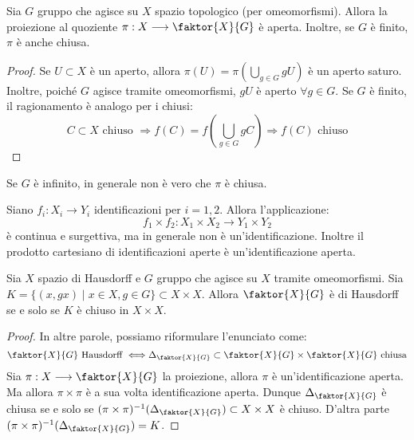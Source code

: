 \begin{prop}
Sia $G$ gruppo che agisce su $X$ spazio topologico (per omeomorfismi). Allora la proiezione al quoziente $\pi:X \longrightarrow \faktor {X}{G}$ è aperta. Inoltre, se $G$ è finito, $\pi$ è anche chiusa.
\end{prop}
\begin{proof}
Se $U \subset X$ è un aperto, allora $\pi (U)=\pi \left(\bigcup _{g \in G} gU\right)$ è un aperto saturo. Inoltre, poiché $G$ agisce tramite omeomorfismi, $gU$ è aperto $\forall g \in G$. Se $G$ è finito, il ragionamento è analogo per i chiusi:
$$C \subset X \text{ chiuso } \Longrightarrow f(C)=f\left(\bigcup _{g \in G} gC\right) \Longrightarrow f(C) \text{ chiuso}$$
\end{proof}

\begin{oss}
Se $G$ è infinito, in generale non è vero che $\pi$ è chiusa.
\end{oss}

\begin{oss}
Siano $f_i:X_i \longrightarrow Y_i$ identificazioni per $i=1,2$. Allora l'applicazione:
$$f_1 \times f_2:X_1 \times X_2 \longrightarrow Y_1 \times Y_2$$
è continua e surgettiva, ma in generale non è un'identificazione. Inoltre il prodotto cartesiano di identificazioni aperte è un'identificazione aperta.
\end{oss}

\begin{prop}
Sia $X$ spazio di Hausdorff e $G$ gruppo che agisce su $X$ tramite omeomorfismi. Sia $K=\{(x,gx) \mid x \in X, g \in G \} \subset X \times X$. Allora $\faktor {X}{G}$ è di Hausdorff se e solo se $K$ è chiuso in $X \times X$.
\end{prop}
\begin{proof}
In altre parole, possiamo riformulare l'enunciato come:
$$\faktor{X}{G} \text{ Hausdorff } \Longleftrightarrow \Delta_{\faktor{X}{G}} \subset \faktor{X}{G} \times \faktor{X}{G} \text{ chiusa}$$
Sia $\pi:X \longrightarrow \faktor{X}{G}$ la proiezione, allora $\pi$ è un'identificazione aperta. Ma allora $\pi \times \pi$ è a sua volta identificazione aperta. Dunque $\Delta _{\faktor{X}{G}}$ è chiusa se e solo se $(\pi \times \pi)^{-1}(\Delta _{\faktor{X}{G}}) \subset X \times X$ è chiuso. D'altra parte $(\pi \times \pi)^{-1}(\Delta _{\faktor{X}{G}})=K$.
\end{proof}